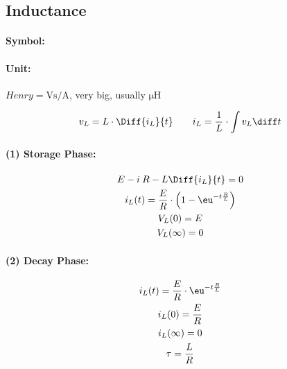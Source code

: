 
\subsection{Inductance} %
	
	\paragraph{Symbol:} %
	\paragraph{Unit:} %
		$\si{Henry} = \si{\volt\second\per\ampere}$, very big, usually $\si{\micro\henry}$
	
	\begin{gather*}
		v_L = L \cdot \Diff{i_L}{t} \qquad i_L = \frac{1}{L} \cdot \int v_L \diff t
	\end{gather*}
	\begin{center}
	\end{center}
	\begin{multicols*}{2}
		\paragraph{(1) Storage Phase:} %
		
			\begin{gather*}
				E - i\:R - L \Diff{i_L}{t} = 0 \\
				i_L(t) = \frac{E}{R} \cdot \left(
					1 - \eu^{-t\frac{R}{L}}
				\right) \\
				V_L(0) = E \\ V_L(\infty) = 0
			\end{gather*}
		
		\paragraph{(2) Decay Phase:} %
		
			\begin{gather*}
				i_L (t) = \frac{E}{R} \cdot \eu^{-t\frac{R}{L}} \\
				i_L(0) = \frac{E}{R} \\
				i_L(\infty) = 0 \\
				\tau = \frac{L}{R}
			\end{gather*}
	\end{multicols*}
	
